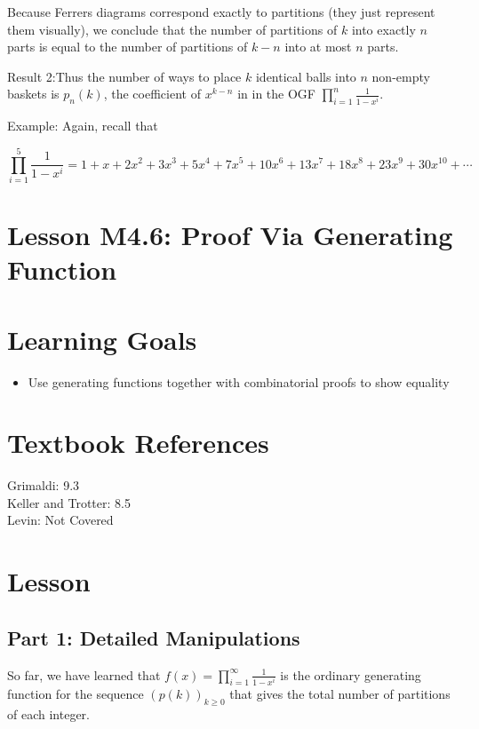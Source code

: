 \documentclass{article}
\theoremstyle{definition}
\begin{document}
Because Ferrers diagrams correspond exactly to partitions (they just represent them visually), we conclude that the number of partitions of $k$ into exactly $n$ parts is equal to the number of partitions of $k-n$ into at most $n$ parts.

Result 2:Thus the number of ways to place $k$ identical balls into $n$ non-empty baskets is $p_{n}(k)$, the coefficient of $x^{k-n}$ in in the OGF $\prod_{i=1}^{n} \frac{1}{1-x^{i}}$.

Example: Again, recall that

$$
\prod_{i=1}^{5} \frac{1}{1-x^{i}}=1+x+2 x^{2}+3 x^{3}+5 x^{4}+7 x^{5}+10 x^{6}+13 x^{7}+18 x^{8}+23 x^{9}+30 x^{10}+\cdots
$$










\newpage


\section*{Lesson M4.6: Proof Via Generating Function}
\section*{Learning Goals}
\begin{itemize}
  \item Use generating functions together with combinatorial proofs to show equality
\end{itemize}

\section*{Textbook References}
Grimaldi: 9.3\\
Keller and Trotter: 8.5\\
Levin: Not Covered

\section*{Lesson}
\subsection*{Part 1: Detailed Manipulations}
So far, we have learned that $f(x)=\prod_{i=1}^{\infty} \frac{1}{1-x^{i}}$ is the ordinary generating function for the sequence $(p(k))_{k \geq 0}$ that gives the total number of partitions of each integer.
\end{document}
